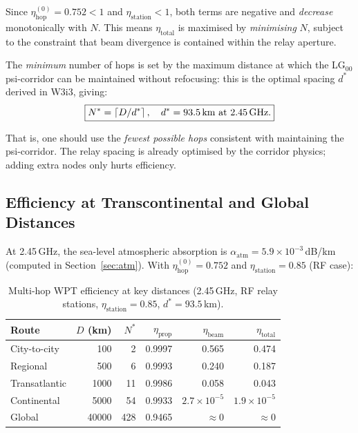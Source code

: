 \documentclass[aps,prd,twocolumn,superscriptaddress]{revtex4-2}
\newcommand{\alphaatm}{\alpha_\mathrm{atm}}
\newcommand{\etahop}{\eta_\mathrm{hop}}
\newcommand{\etastat}{\eta_\mathrm{station}}
\begin{document}
Since $\etahop^{(0)} = 0.752 < 1$ and $\etastat < 1$, both terms
are negative and \emph{decrease} monotonically with $N$.
This means $\eta_\mathrm{total}$ is maximised by \emph{minimising} $N$,
subject to the constraint that beam divergence is contained within the
relay aperture.

The \emph{minimum} number of hops is set by the maximum distance
at which the LG$_{00}$ psi-corridor can be maintained without
refocusing: this is the optimal spacing $d^*$ derived in W3i3,
giving:
\begin{equation}
\boxed{N^* = \left\lceil D/d^* \right\rceil,
\quad d^* = 93.5\,\mathrm{km}\text{ at 2.45\,GHz}.}
\label{eq:Nstar}
\end{equation}

That is, one should use the \emph{fewest possible hops} consistent with
maintaining the psi-corridor. The relay spacing is already optimised
by the corridor physics; adding extra nodes only hurts efficiency.

\subsection{Efficiency at Transcontinental and Global Distances}

At 2.45\,GHz, the sea-level atmospheric absorption is
$\alphaatm = 5.9\times10^{-3}$\,dB/km (computed in Section~\ref{sec:atm}).
With $\etahop^{(0)} = 0.752$ and $\etastat = 0.85$ (RF case):

\begin{table}[H]
\centering
\caption{Multi-hop WPT efficiency at key distances (2.45\,GHz, RF relay
stations, $\etastat = 0.85$, $d^* = 93.5$\,km).}
\label{tab:multihop}
\begin{tabular}{lrrrrr}
\toprule
Route & $D$ (km) & $N^*$ & $\eta_\mathrm{prop}$ & $\eta_\mathrm{beam}$ & $\eta_\mathrm{total}$ \\
\midrule
City-to-city & 100  & 2  & 0.9997 & 0.565 & 0.474 \\
Regional     & 500  & 6  & 0.9993 & 0.240 & 0.187 \\
Transatlantic& 1000 & 11 & 0.9986 & 0.058 & 0.043 \\
Continental  & 5000 & 54 & 0.9933 & $2.7\times10^{-5}$ & $1.9\times10^{-5}$ \\
Global       & 40000& 428& 0.9465 & $\approx 0$ & $\approx 0$ \\
\bottomrule
\end{tabular}
\end{table}
\end{document}
